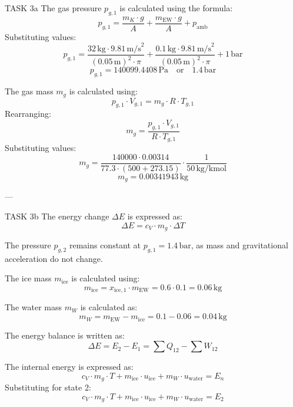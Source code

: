 TASK 3a  
The gas pressure \( p_{g,1} \) is calculated using the formula:  
\[
p_{g,1} = \frac{m_K \cdot g}{A} + \frac{m_{\text{EW}} \cdot g}{A} + p_{\text{amb}}
\]  
Substituting values:  
\[
p_{g,1} = \frac{32 \, \text{kg} \cdot 9.81 \, \text{m/s}^2}{(0.05 \, \text{m})^2 \cdot \pi} + \frac{0.1 \, \text{kg} \cdot 9.81 \, \text{m/s}^2}{(0.05 \, \text{m})^2 \cdot \pi} + 1 \, \text{bar}
\]  
\[
p_{g,1} = 140099.4408 \, \text{Pa} \quad \text{or} \quad 1.4 \, \text{bar}
\]  

The gas mass \( m_g \) is calculated using:  
\[
p_{g,1} \cdot V_{g,1} = m_g \cdot R \cdot T_{g,1}
\]  
Rearranging:  
\[
m_g = \frac{p_{g,1} \cdot V_{g,1}}{R \cdot T_{g,1}}
\]  
Substituting values:  
\[
m_g = \frac{140000 \cdot 0.00314}{77.3 \cdot (500 + 273.15)} \cdot \frac{1}{50 \, \text{kg/kmol}}
\]  
\[
m_g = 0.00341943 \, \text{kg}
\]  

---

TASK 3b  
The energy change \( \Delta E \) is expressed as:  
\[
\Delta E = c_V \cdot m_g \cdot \Delta T
\]  

The pressure \( p_{g,2} \) remains constant at \( p_{g,1} = 1.4 \, \text{bar} \), as mass and gravitational acceleration do not change.  

The ice mass \( m_{\text{ice}} \) is calculated using:  
\[
m_{\text{ice}} = x_{\text{ice},1} \cdot m_{\text{EW}} = 0.6 \cdot 0.1 = 0.06 \, \text{kg}
\]  

The water mass \( m_W \) is calculated as:  
\[
m_W = m_{\text{EW}} - m_{\text{ice}} = 0.1 - 0.06 = 0.04 \, \text{kg}
\]  

The energy balance is written as:  
\[
\Delta E = E_2 - E_1 = \sum Q_{12} - \sum W_{12}
\]  

The internal energy is expressed as:  
\[
c_V \cdot m_g \cdot T + m_{\text{ice}} \cdot u_{\text{ice}} + m_W \cdot u_{\text{water}} = E_n
\]  
Substituting for state 2:  
\[
c_V \cdot m_g \cdot T + m_{\text{ice}} \cdot u_{\text{ice}} + m_W \cdot u_{\text{water}} = E_2
\]  

